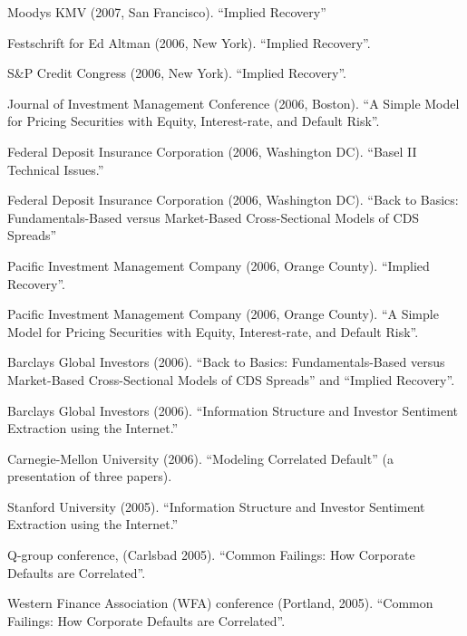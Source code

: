 \documentclass{article}
\begin{document}
\begin{etaremune}
{\item Moodys KMV (2007, San Francisco).
``Implied Recovery'' 

\item Festschrift for Ed Altman (2006, New York).
``Implied Recovery''.

\item S\&P Credit Congress (2006, New York).
``Implied Recovery''.

\item Journal of Investment Management Conference (2006, Boston). 
``A Simple Model for Pricing  Securities with
Equity, Interest-rate, and Default Risk''.

\item Federal Deposit Insurance Corporation (2006, Washington DC).
``Basel II Technical Issues.''

\item Federal Deposit Insurance Corporation (2006, Washington DC).
``Back to Basics: Fundamentals-Based versus Market-Based Cross-Sectional Models of CDS Spreads''

\item Pacific Investment Management Company (2006, Orange County). 
``Implied Recovery''.

\item Pacific Investment Management Company (2006, Orange County). 
``A Simple Model for Pricing  Securities with
Equity, Interest-rate, and Default Risk''.


\item Barclays Global Investors (2006). 
``Back to Basics: Fundamentals-Based versus Market-Based Cross-Sectional Models of CDS Spreads'' and ``Implied Recovery''. 

\item Barclays Global Investors (2006). 
``Information Structure and Investor Sentiment Extraction using the Internet.''

\item Carnegie-Mellon University (2006). 
``Modeling Correlated Default'' (a presentation of three papers). 

\item Stanford University (2005). 
``Information Structure and Investor Sentiment Extraction using the Internet.''

\item Q-group conference, (Carlsbad 2005). 
``Common Failings: How Corporate Defaults are Correlated''. 


\item Western Finance Association (WFA) conference (Portland, 2005). 
``Common Failings: How Corporate Defaults are Correlated''. 

}
\end{etaremune}
\end{document}

